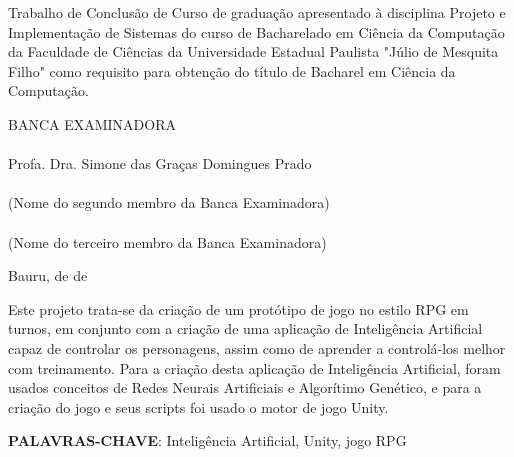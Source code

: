 \documentclass[
	12pt,					%
	openright,				%
	oneside,				%
	a4paper,				%
	bibjustif,				%
	chapter=TITLE,			%
	english,				%
	brazil,					%
	]{abntex2}
\begin{document}
\newpage %
\thispagestyle{empty} %
\begin{center}
\makeatletter
	\textbf{\@author}

	\vspace{3.0cm} %
	\textbf{\large \@title}
\makeatother
\end{center}

\begin{adjustwidth}{7cm}{0cm}
	\vspace{1.5cm}
	Trabalho de Conclusão de Curso de graduação apresentado à disciplina Projeto e Implementação de Sistemas do curso de Bacharelado em Ciência da Computação da Faculdade de Ciências da Universidade Estadual Paulista "Júlio de Mesquita Filho"{} como requisito para obtenção do título de Bacharel em Ciência da Computação.
\end{adjustwidth}

\begin{center}
	\vspace{1.0cm}
	BANCA EXAMINADORA\\
	
	\vspace{1.0cm}
	\underline{\hspace{8cm}}\\
	Profa. Dra. Simone das Graças Domingues Prado\\
	\vspace{1.0cm}
	\underline{\hspace{8cm}}\\
	(Nome do segundo membro da Banca Examinadora)\\
	\vspace{1.0cm}
	\underline{\hspace{8cm}}\\
	(Nome do terceiro membro da Banca Examinadora)

	\vspace*{\fill} %
	Bauru, \underline{\hspace{1cm}} de \underline{\hspace{3cm}} de \underline{\hspace{1.5cm}}
\end{center}

\newpage %
\thispagestyle{empty} %
\begin{resumo}
	\SingleSpacing
	Este projeto trata-se da criação de um protótipo de jogo no estilo RPG em turnos,
	em conjunto com a criação de uma aplicação de Inteligência Artificial capaz de controlar os personagens,
	assim como de aprender a controlá-los melhor com treinamento.
	Para a criação desta aplicação de Inteligência Artificial,
	foram usados conceitos de Redes Neurais Artificiais e Algorítimo Genético,
	e para a criação do jogo e seus scripts
	foi usado o motor de jogo Unity.
 	
 	\vspace{\onelineskip}
	\textbf{PALAVRAS-CHAVE}: Inteligência Artificial, Unity, jogo RPG
\end{resumo}
\end{document}
